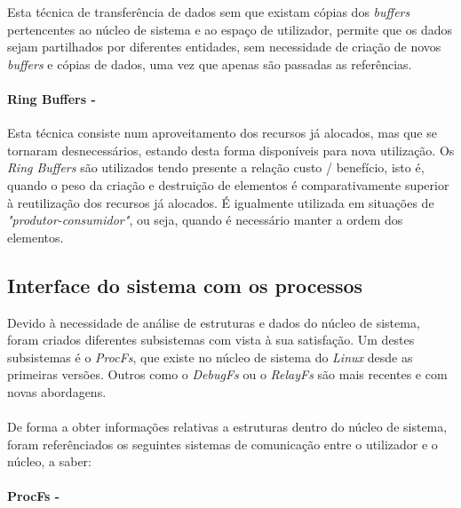 Esta técnica de transferência de dados sem que existam cópias dos \textit{buffers} pertencentes ao núcleo de sistema e ao espaço de utilizador, permite que os dados sejam partilhados por diferentes entidades, sem necessidade de criação de novos \textit{buffers} e cópias de dados, uma vez que apenas são passadas as referências.

\paragraph*{Ring Buffers - }

Esta técnica consiste num aproveitamento dos recursos já alocados, mas que se tornaram desnecessários, estando desta forma disponíveis para nova utilização.
Os \textit{Ring Buffers} são utilizados tendo presente a relação custo / benefício, isto é, quando o peso da criação e destruição de elementos é comparativamente superior à reutilização dos recursos já alocados.
É igualmente utilizada em situações de \textit{"produtor-consumidor"}, ou seja, quando é necessário manter a ordem dos elementos.


\subsection{Interface do sistema com os processos}
% 

Devido à necessidade de análise de estruturas e dados do núcleo de sistema, foram criados diferentes subsistemas com vista à sua satisfação.
Um destes subsistemas é o \textit{ProcFs}, que existe no núcleo de sistema do \textit{Linux} desde as primeiras versões.
Outros como o \textit{DebugFs} ou o \textit{RelayFs} são mais recentes e com novas abordagens.

\paragraph*{}
De forma a obter informações relativas a estruturas dentro do núcleo de sistema, foram referênciados os seguintes sistemas de comunicação entre o utilizador e o núcleo, a saber:

\paragraph*{ProcFs - }\label{cap:ProcFs_overview}

